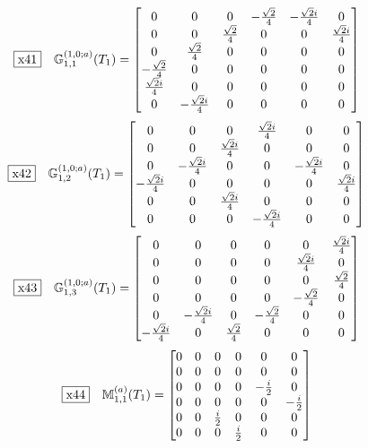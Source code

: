 \documentclass[fleqn,10pt,landscape]{jsarticle}
\begin{document}
\begin{dmath*}
\fbox{x41}\quad \mathbb{G}_{1,1}^{(1,0;a)}(T_{1})=\begin{bmatrix} 0 & 0 & 0 & - \frac{\sqrt{2}}{4} & - \frac{\sqrt{2} i}{4} & 0 \\ 0 & 0 & \frac{\sqrt{2}}{4} & 0 & 0 & \frac{\sqrt{2} i}{4} \\ 0 & \frac{\sqrt{2}}{4} & 0 & 0 & 0 & 0 \\ - \frac{\sqrt{2}}{4} & 0 & 0 & 0 & 0 & 0 \\ \frac{\sqrt{2} i}{4} & 0 & 0 & 0 & 0 & 0 \\ 0 & - \frac{\sqrt{2} i}{4} & 0 & 0 & 0 & 0 \end{bmatrix}
\end{dmath*}
\begin{dmath*}
\fbox{x42}\quad \mathbb{G}_{1,2}^{(1,0;a)}(T_{1})=\begin{bmatrix} 0 & 0 & 0 & \frac{\sqrt{2} i}{4} & 0 & 0 \\ 0 & 0 & \frac{\sqrt{2} i}{4} & 0 & 0 & 0 \\ 0 & - \frac{\sqrt{2} i}{4} & 0 & 0 & - \frac{\sqrt{2} i}{4} & 0 \\ - \frac{\sqrt{2} i}{4} & 0 & 0 & 0 & 0 & \frac{\sqrt{2} i}{4} \\ 0 & 0 & \frac{\sqrt{2} i}{4} & 0 & 0 & 0 \\ 0 & 0 & 0 & - \frac{\sqrt{2} i}{4} & 0 & 0 \end{bmatrix}
\end{dmath*}
\begin{dmath*}
\fbox{x43}\quad \mathbb{G}_{1,3}^{(1,0;a)}(T_{1})=\begin{bmatrix} 0 & 0 & 0 & 0 & 0 & \frac{\sqrt{2} i}{4} \\ 0 & 0 & 0 & 0 & \frac{\sqrt{2} i}{4} & 0 \\ 0 & 0 & 0 & 0 & 0 & \frac{\sqrt{2}}{4} \\ 0 & 0 & 0 & 0 & - \frac{\sqrt{2}}{4} & 0 \\ 0 & - \frac{\sqrt{2} i}{4} & 0 & - \frac{\sqrt{2}}{4} & 0 & 0 \\ - \frac{\sqrt{2} i}{4} & 0 & \frac{\sqrt{2}}{4} & 0 & 0 & 0 \end{bmatrix}
\end{dmath*}
\begin{dmath*}
\fbox{x44}\quad \mathbb{M}_{1,1}^{(a)}(T_{1})=\begin{bmatrix} 0 & 0 & 0 & 0 & 0 & 0 \\ 0 & 0 & 0 & 0 & 0 & 0 \\ 0 & 0 & 0 & 0 & - \frac{i}{2} & 0 \\ 0 & 0 & 0 & 0 & 0 & - \frac{i}{2} \\ 0 & 0 & \frac{i}{2} & 0 & 0 & 0 \\ 0 & 0 & 0 & \frac{i}{2} & 0 & 0 \end{bmatrix}
\end{dmath*}
\end{document}

